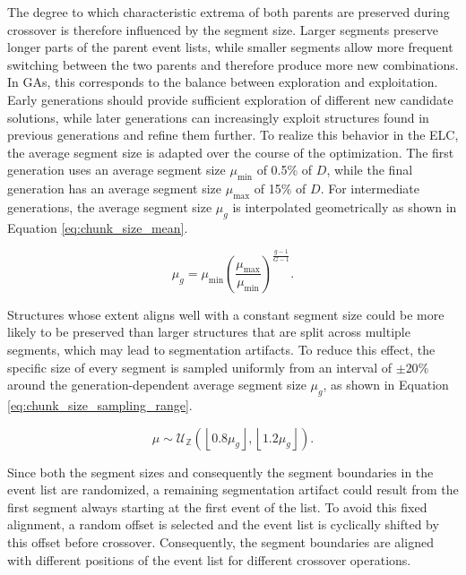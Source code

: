     The degree to which characteristic extrema of both parents are preserved during crossover is therefore influenced by the segment size. Larger segments preserve longer parts of the parent event lists, while smaller segments allow more frequent switching between the two parents and therefore produce more new combinations. In GAs, this corresponds to the balance between exploration and exploitation. Early generations should provide sufficient exploration of different new candidate solutions, while later generations can increasingly exploit structures found in previous generations and refine them further. To realize this behavior in the ELC, the average segment size is adapted over the course of the optimization. The first generation uses an average segment size $\mu_{\min}$ of 0.5\% of $D$, while the final generation has an average segment size $\mu_{\max}$ of 15\% of $D$. For intermediate generations, the average segment size $\mu_g$ is interpolated geometrically as shown in Equation \ref{eq:chunk_size_mean}.
    
\begin{equation}
\mu_g =
\mu_{\min}
\left(
    \frac{\mu_{\max}}{\mu_{\min}}
\right)^{
    \frac{g-1}{G-1}
}.
\label{eq:chunk_size_mean}
\end{equation}

    Structures whose extent aligns well with a constant segment size could be more likely to be preserved than larger structures that are split across multiple segments, which may lead to segmentation artifacts. To reduce this effect, the specific size of every segment is sampled uniformly from an interval of $\pm20\%$ around the generation-dependent average segment size $\mu_g$, as shown in Equation \ref{eq:chunk_size_sampling_range}.
    
    \begin{equation}
        \mu \sim
        \mathcal{U}_{\mathbb{Z}}
        \left(
        \left\lfloor 0.8\mu_g \right\rfloor,
        \left\lfloor 1.2\mu_g \right\rfloor
        \right).
    \label{eq:chunk_size_sampling_range}
    \end{equation}
    
    Since both the segment sizes and consequently the segment boundaries in the event list are randomized, a remaining segmentation artifact could result from the first segment always starting at the first event of the list. To avoid this fixed alignment, a random offset is selected and the event list is cyclically shifted by this offset before crossover. Consequently, the segment boundaries are aligned with different positions of the event list for different crossover operations.
    
